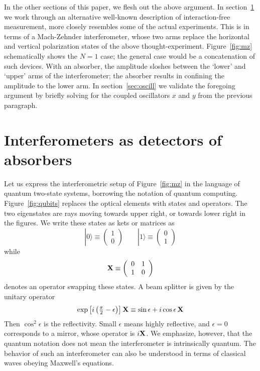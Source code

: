 \documentclass[prb,preprint]{revtex4-1}
\def\ket#1{|#1\rangle}
\def\X{{\bf X}}
\begin{document}
In the other sections of this paper, we flesh out the above argument.
In section~\ref{sec:interf} we work through an alternative well-known
description of interaction-free measurement, more closely resembles
some of the actual experiments.  This is in terms of a Mach-Zehnder
interferometer, whose two arms replace the horizontal and vertical
polarization states of the above thought-experiment.
Figure~\ref{fig:mz} schematically shows the $N=1$ case; the general
case would be a concatenation of such devices.  With an absorber, the
amplitude sloshes between the `lower' and `upper' arms of the
interferometer; the absorber results in confining the amplitude to the
lower arm.  In section~\ref{sec:oscill} we validate the foregoing
argument by briefly solving for the coupled oscillators $x$ and $y$
from the previous paragraph.


\section{Interferometers as detectors of absorbers}\label{sec:interf}

Let us express the interferometric setup of Figure~\ref{fig:mz} in the
language of quantum two-state systems, borrowing the notation of
quantum computing.  Figure~\ref{fig:qubits} replaces the optical
elements with states and operators.  The two eigenstates are rays
moving towards upper right, or towards lower right in the figures. We
write these states as kets or matrices as
\begin{equation}
\ket0 \equiv \left( \begin{array}{c} 1 \\ 0 \end{array} \right)  \qquad
\ket1 \equiv \left( \begin{array}{c} 0 \\ 1 \end{array} \right)
\end{equation}
while
\begin{equation}
\X \equiv \left( \begin{array}{cc} 0 & 1 \\ 1 & 0 \end{array} \right)
\end{equation}
denotes an operator swapping these states.  A beam splitter is given
by the unitary operator
\begin{equation}
\exp\left[i\left({\textstyle\frac\pi2-\epsilon}\right)\right] \X \equiv
\sin\epsilon + i\cos\epsilon\,\X
\end{equation}
Then $\cos^2\epsilon$ is the reflectivity.  Small $\epsilon$ means
highly reflective, and $\epsilon=0$ corresponds to a mirror, whose
operator is $i\X$.  We emphasize, however, that the quantum notation
does not mean the interferometer is intrinsically quantum.  The
behavior of such an interferometer can also be understood in terms of
classical waves obeying Maxwell's equations.
\end{document}
